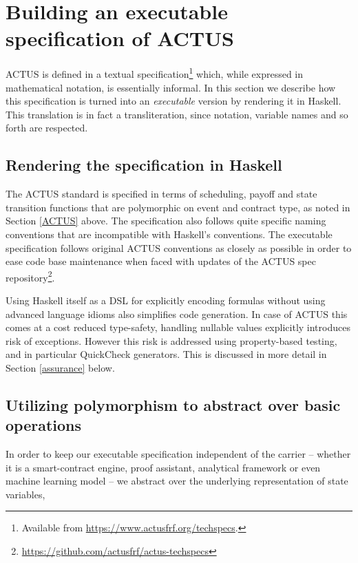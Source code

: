 \documentclass[runningheads]{llncs}
\begin{document}
\section{Building an executable specification of ACTUS}
\label{executable}

ACTUS is defined in a textual specification\footnote{Available from \url{https://www.actusfrf.org/techspecs}.} which, while expressed in mathematical notation, is essentially informal. In this section we describe how this specification is turned into an \emph{executable} version by rendering it in Haskell. This translation is in fact a transliteration, since notation, variable names and so forth are respected.

\subsection{Rendering the specification in Haskell}

The ACTUS standard is specified in terms of scheduling, payoff and
state transition functions that are polymorphic on event and contract
type, as noted in Section \ref{ACTUS} above. The specification also follows quite specific naming conventions
that are incompatible with Haskell's conventions. The executable specification
follows original ACTUS conventions as closely as possible in order to
ease code base maintenance when faced with updates of the ACTUS
spec repository\footnote{\url{https://github.com/actusfrf/actus-techspecs}}.

Using Haskell itself as a DSL for explicitly encoding formulas without
using advanced language idioms also simplifies code generation. 
In case of ACTUS this comes at a cost reduced type-safety, handling nullable
values explicitly introduces risk of exceptions. However this risk
is addressed using property-based testing, and in particular QuickCheck generators. This is discussed in more detail in Section \ref{assurance} below.

\subsection{Utilizing polymorphism to abstract over basic operations}

In order to keep our executable specification independent of the carrier -- whether it is a smart-contract engine, proof assistant, analytical framework
or even machine learning model -- we abstract over the underlying representation
of state variables,
\end{document}
